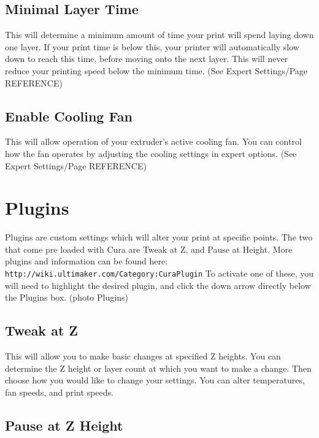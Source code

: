 \subsection{Minimal Layer Time}

This will determine a minimum amount of time your print will spend laying down one layer. If your print time is below this, your printer will automatically slow down to reach this time, before moving onto the next layer. This will never reduce your printing speed below the minimum time. (See Expert Settings/Page REFERENCE)

\subsection{Enable Cooling Fan}

This will allow operation of your extruder's active cooling fan. You can control how the fan operates by adjusting the cooling settings in expert options. (See Expert Settings/Page REFERENCE)

\section{Plugins}

Plugins are custom settings which will alter your print at specific points. The two that come pre loaded with Cura are Tweak at Z, and Pause at Height. More plugins and information can be found here: \texttt{http://wiki.ultimaker.com/Category:CuraPlugin} To activate one of these, you will need to highlight the desired plugin, and click the down arrow directly below the Plugins box. (photo Plugins)

\subsection{Tweak at Z}

This will allow you to make basic changes at specified Z heights. You can determine the Z height or layer count at which you want to make a change. Then choose how you would like to change your settings. You can alter temperatures, fan speeds, and print speeds.

\subsection{Pause at Z Height}

